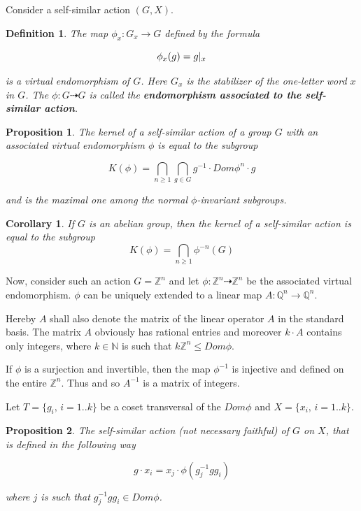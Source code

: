 \documentclass[a4paper,12pt]{amsart}
\newtheorem{definition}{Definition}
\newtheorem{corollary}{Corollary}
\newtheorem{proposition}{Proposition}
\begin{document}
	Consider a self-similar action $(G, X)$.
	
	\begin{definition}
		The map $\phi_x : G_x \rightarrow G$ defined by the formula 
		
		$$\phi_x(g) = g\arrowvert_x$$
		
		is a virtual endomorphism of $G$. Here $G_x$ is the stabilizer of the one-letter word $x$ in $G$. The $\phi : G \dashrightarrow G$ is called the \textbf{endomorphism associated to the self-similar action}. 
	\end{definition}
	
	\begin{proposition}
		The kernel of a self-similar action of a group $G$ with an associated virtual endomorphism $\phi$ is equal to the subgroup 
		
		$$K(\phi) = \bigcap_{n\ge 1}\bigcap_{g \in G} g^{-1} \cdot Dom \phi^n \cdot g$$
		
		and is the maximal one among the normal $\phi$-invariant subgroups.
	\end{proposition}
	
	\begin{corollary}
		If $G$ is an abelian group, then the kernel of a self-similar action  is equal to the subgroup 
		$$K(\phi) = \bigcap_{n\ge 1} \phi^{-n}(G)$$
		
	\end{corollary}
	
	Now, consider such an action $G = \mathbb{Z}^n$ and let $\phi : \mathbb{Z}^n \dashrightarrow \mathbb{Z}^n$ be the associated virtual endomorphism. $\phi$ can be uniquely extended to a linear map $A : \mathbb{Q}^n \rightarrow \mathbb{Q}^n$.
	
	Hereby $A$ shall also denote the matrix of the linear operator $A$ in the standard basis. The matrix $A$ obviously has rational entries and moreover $k \cdot A$ contains only integers, where $k \in \mathbb{N}$ is such that $k\mathbb{Z}^n \le Dom \phi$.
	
	If $\phi$ is a surjection and invertible, then the map $\phi^{-1}$ is injective and defined on the entire $\mathbb{Z}^n$. Thus and so $A^{-1}$ is a matrix of integers.
	
	Let $T = \{g_i,\, i=1..k\}$ be a coset transversal of the $Dom \phi$ and $X = \{x_i,\, i=1..k\}$.	
	
	\begin{proposition}
		The self-similar action (not necessary faithful) of $G$ on $X$, that is defined in the following way 
		
		$$g \cdot x_i = x_j \cdot \phi(g_j^{-1} g g_i)$$
		
		where $j$ is such that $g^{-1}_j g g_i \in Dom \phi $. 
	\end{proposition}
	
\end{document}
